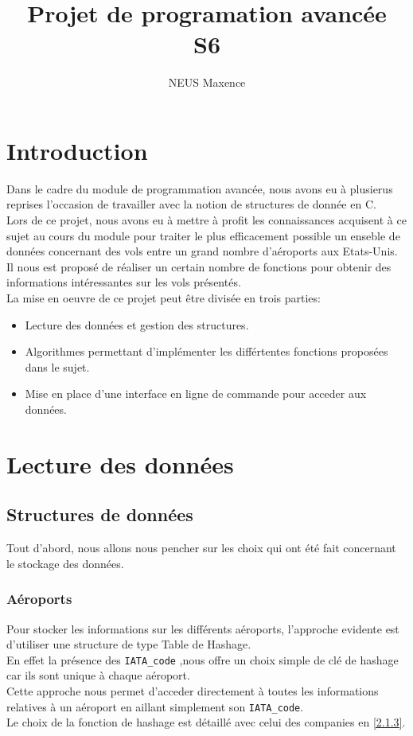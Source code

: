 \documentclass[a4paper, 12pt]{article}
\begin{document}
	\title{Projet de programation avancée\\S6}
	\author{NEUS Maxence}
	\maketitle
	\newpage
	
	\tableofcontents
	\newpage
	
	\section{Introduction}
	Dans le cadre du module de programmation avancée, nous avons eu à plusierus reprises l'occasion de travailler avec la notion de structures de donnée en C.\\
	Lors de ce projet, nous avons eu à mettre à profit les connaissances acquisent à ce sujet au cours du module pour traiter le plus efficacement possible un enseble de données concernant des vols entre un grand nombre d'aéroports aux Etats-Unis. Il nous est proposé de réaliser un certain nombre de fonctions pour obtenir des informations intéressantes sur les vols présentés.\\
	La mise en oeuvre de ce projet peut être divisée en trois parties: 
	\begin{itemize}
		\item Lecture des données et gestion des structures.
		\item Algorithmes permettant d'implémenter les différtentes fonctions proposées dans le sujet.
		\item Mise en place d'une interface en ligne de commande pour acceder aux données.
	\end{itemize}

	\section{Lecture des données}
	\subsection{Structures de données}
	Tout d'abord, nous allons nous pencher sur les choix qui ont été fait concernant le stockage des données.
	\subsubsection{Aéroports}
	Pour stocker les informations sur les différents aéroports, l'approche evidente est d'utiliser une structure de type Table de Hashage.\\
	En effet la présence des \lstinline|IATA_code| ,nous offre un choix simple de clé de hashage car ils sont unique à chaque aéroport.\\
	Cette approche nous permet d'acceder directement à toutes les informations relatives à un aéroport en aillant simplement son \lstinline|IATA_code|.\\
	Le choix de la fonction de hashage est détaillé avec celui des companies en \ref{2.1.3}.\\
	
\end{document}
